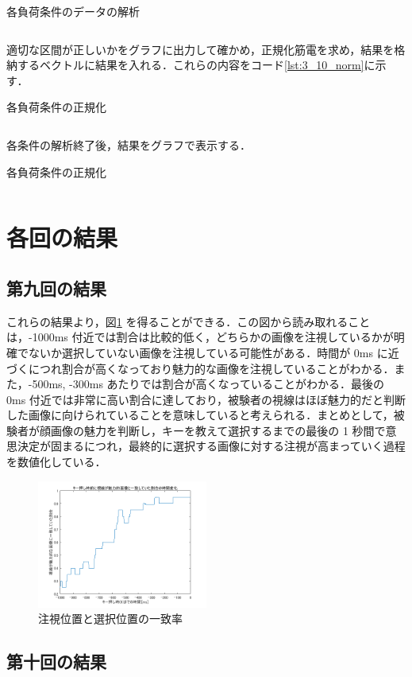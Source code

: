 \documentclass[dvipdfmx, titlepage, t]{jsarticle}
\begin{document}
    \begin{program}
        \caption{各負荷条件のデータの解析}
        \inputminted[linenos,
        firstline=71,
        lastline=90,
        frame=lines,
        fontsize = \small]{matlab}{code/Exp3_10_Matlab.m}
        \label{lst:3_10_ana}        
    \end{program}

    適切な区間が正しいかをグラフに出力して確かめ，正規化筋電を求め，結果を格納するベクトルに結果を入れる．これらの内容をコード\ref{lst:3_10_norm}に示す．

    \begin{program}
        \caption{各負荷条件の正規化}
        \inputminted[linenos,
        firstline=71,
        lastline=90,
        frame=lines,
        fontsize = \small]{matlab}{code/Exp3_10_Matlab.m}
        \label{lst:3_10_norm}
    \end{program}

    各条件の解析終了後，結果をグラフで表示する．

    \begin{program}
        \caption{各負荷条件の正規化}
        \inputminted[linenos,
        firstline=142,
        lastline=157,
        frame=lines,
        fontsize = \small]{matlab}{code/Exp3_10_Matlab.m}
        \label{lst:3_10_norm}        
    \end{program}

    \section{各回の結果}

    \subsection{第九回の結果}
    これらの結果より，図\ref{fig:exp3_9_plot} を得ることができる．この図から読み取れることは，-1000ms 付近では割合は比較的低く，どちらかの画像を注視しているかが明確でないか選択していない画像を注視している可能性がある．時間が 0ms に近づくにつれ割合が高くなっており魅力的な画像を注視していることがわかる．また，-500ms, -300ms あたりでは割合が高くなっていることがわかる．最後の 0ms 付近では非常に高い割合に達しており，被験者の視線はほぼ魅力的だと判断した画像に向けられていることを意味していると考えられる．まとめとして，被験者が顔画像の魅力を判断し，キーを教えて選択するまでの最後の 1 秒間で意思決定が固まるにつれ，最終的に選択する画像に対する注視が高まっていく過程を数値化している．
    \begin{figure}[H]
        \centering
        \includegraphics[width=0.5\textwidth]{figure/g0310/lab3_2.png}
        \caption{注視位置と選択位置の一致率}
        \label{fig:exp3_9_plot}
    \end{figure}

    \subsection{第十回の結果}
\end{document}

